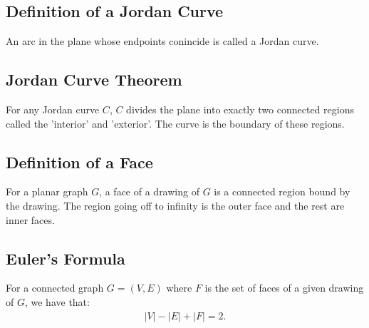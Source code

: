 \documentclass[a4paper, 12pt, twoside]{article}
\begin{document}
\subsection{Definition of a Jordan Curve}

An arc in the plane whose endpoints conincide is called a Jordan curve.

\subsection{Jordan Curve Theorem}

For any Jordan curve $C$, $C$ divides the plane into exactly two connected regions
called the 'interior' and 'exterior'. The curve is the boundary of these regions. 

\subsection{Definition of a Face}

For a planar graph $G$, a face of a drawing of $G$ is a connected region
bound by the drawing. The region going off to infinity is the outer face and
the rest are inner faces.

\subsection{Euler's Formula}

For a connected graph $G = (V, E)$ where $F$ is the set of faces of a given 
drawing of $G$, we have that: \begin{gather*}
  |V| - |E| + |F| = 2.
\end{gather*}
\end{document}
